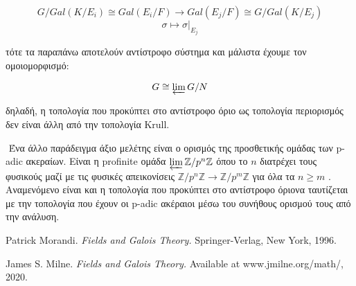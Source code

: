 \documentclass[oneside,a4paper]{article}
\newcommand {\tl}{\textlatin}
\begin{document}
$$G/Gal(K/E_i) \cong Gal(E_i /F) \longrightarrow Gal(E_j /F) \cong G/Gal(K/E_j)$$
$$\sigma \longmapsto \sigma|_{E_j}$$

\noindent τότε τα παραπάνω αποτελούν αντίστροφο σύστημα και μάλιστα έχουμε τον ομοιομορφισμό:

$$G \cong \varprojlim G/N$$

\noindent δηλαδή, η τοπολογία που προκύπτει στο αντίστροφο όριο ως τοπολογία περιορισμός δεν είναι άλλη από την τοπολογία Krull.

$ $\newline
Ένα άλλο παράδειγμα άξιο μελέτης είναι ο ορισμός της προσθετικής ομάδας των p-adic ακεραίων. Είναι η profinite ομάδα $\varprojlim \mathbb{Z}/p^n \mathbb{Z}$ όπου το $n$ διατρέχει τους φυσικούς μαζί με τις φυσικές απεικονίσεις $\mathbb{Z}/p^n \mathbb{Z} \rightarrow \mathbb{Z}/p^m \mathbb{Z}$ για όλα τα $n\geq m$ . Αναμενόμενο είναι και η τοπολογία που προκύπτει στο αντίστροφο όριονα ταυτίζεται με την τοπολογία που έχουν οι p-adic ακέραιοι μέσω του συνήθους ορισμού τους από την ανάλυση.

\pagebreak

\begin{thebibliography}{9}
	\tl{Patrick Morandi.}
	\textit{\tl{Fields and Galois Theory.}}
	\tl{Springer-Verlag, New York, 1996.}

	\tl{James S. Milne.}
	\textit{\tl{Fields and Galois Theory.}}
	\tl{Available at www.jmilne.org/math/, 2020.}
\end{thebibliography}

%
\end{document}
